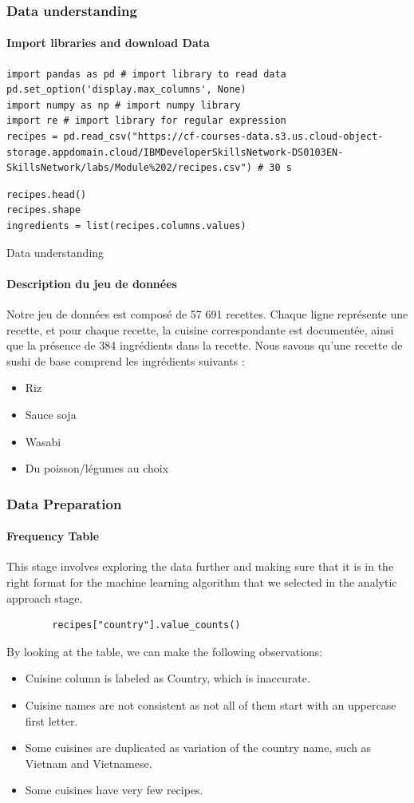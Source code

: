 \documentclass{beamer}
\begin{document}
\begin{frame}[fragile]
	\frametitle{Data understanding}	
	\framesubtitle{Import libraries and download Data}
	\begin{lstlisting}
import pandas as pd # import library to read data
pd.set_option('display.max_columns', None)
import numpy as np # import numpy library
import re # import library for regular expression
recipes = pd.read_csv("https://cf-courses-data.s3.us.cloud-object-storage.appdomain.cloud/IBMDeveloperSkillsNetwork-DS0103EN-SkillsNetwork/labs/Module%202/recipes.csv") # 30 s
	\end{lstlisting}
\begin{lstlisting}
recipes.head()	
recipes.shape
ingredients = list(recipes.columns.values)
\end{lstlisting}	
\end{frame}

\begin{frame}{Data understanding}
	\framesubtitle{Description du jeu de données}
	Notre jeu de données est composé de 57 691 recettes. Chaque ligne représente une recette, et pour chaque recette, la cuisine correspondante est documentée, ainsi que la présence de 384 ingrédients dans la recette. Nous savons qu'une recette de sushi de base comprend les ingrédients suivants :
\begin{itemize}
	\item Riz
	\item Sauce soja
	\item Wasabi
	\item Du poisson/légumes au choix
\end{itemize}
\end{frame}


\begin{frame}[fragile]
	\frametitle{Data Preparation}
	\framesubtitle{Frequency Table}	
This stage involves exploring the data further and making sure that it is in the right format for the machine learning algorithm that we selected in the analytic approach stage.
	\begin{lstlisting}
		recipes["country"].value_counts()
	\end{lstlisting}
By looking at the table, we can make the following observations:

\begin{itemize}
	\item  Cuisine column is labeled as Country, which is inaccurate.
\item   Cuisine names are not consistent as not all of them start with an uppercase first letter.
\item   Some cuisines are duplicated as variation of the country name, such as Vietnam and Vietnamese.
\item   Some cuisines have very few recipes.

\end{itemize}	
\end{frame}
\end{document}
